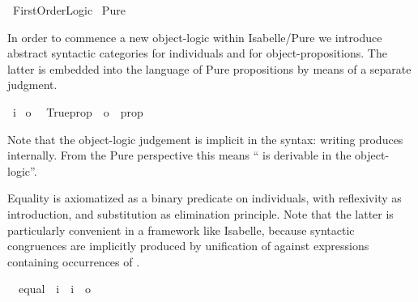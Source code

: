 %
\begin{isabellebody}%
\def\isabellecontext{First{\isacharunderscore}Order{\isacharunderscore}Logic}%
%
\isamarkuptrue%
%
\isadelimvisible
%
\endisadelimvisible
%
\isatagvisible
{}\isamarkupfalse%
\ First{\isacharunderscore}Order{\isacharunderscore}Logic\isanewline
{}\ Pure\isanewline
{}%
\endisatagvisible
{\isafoldvisible}%
%
\isadelimvisible
%
\endisadelimvisible
%
\begin{isamarkuptext}%
\noindent In order to commence a new object-logic within
  Isabelle/Pure we introduce abstract syntactic categories 
  for individuals and  for object-propositions.  The latter
  is embedded into the language of Pure propositions by means of a
  separate judgment.%
\end{isamarkuptext}%
\isamarkuptrue%
\isamarkupfalse%
\ i\isanewline
{}\isamarkupfalse%
\ o\isanewline
\isanewline
{}\isamarkupfalse%
\isanewline
\ \ Trueprop\ {\isacharcolon}{\isacharcolon}\ {\isachardoublequoteopen}o\ {\isasymRightarrow}\ prop{\isachardoublequoteclose}\ \ \ \ {\isacharparenleft}{\isachardoublequoteopen}{\isacharunderscore}{\isachardoublequoteclose}\ {}{\isacharparenright}%
\begin{isamarkuptext}%
\noindent Note that the object-logic judgement is implicit in the
  syntax: writing  produces  internally.
  From the Pure perspective this means `` is derivable in the
  object-logic''.%
\end{isamarkuptext}%
\isamarkuptrue%
%
\isamarkuptrue%
%
\begin{isamarkuptext}%
Equality is axiomatized as a binary predicate on individuals, with
  reflexivity as introduction, and substitution as elimination
  principle.  Note that the latter is particularly convenient in a
  framework like Isabelle, because syntactic congruences are
  implicitly produced by unification of  against
  expressions containing occurrences of .%
\end{isamarkuptext}%
\isamarkuptrue%
\isamarkupfalse%
\isanewline
\ \ equal\ {\isacharcolon}{\isacharcolon}\ {\isachardoublequoteopen}i\ {\isasymRightarrow}\ i\ {\isasymRightarrow}\ o{\isachardoublequoteclose}\ \ {\isacharparenleft}\ {\isachardoublequoteopen}{\isacharequal}{\isachardoublequoteclose}\ {}{}{\isacharparenright}\isanewline

\end{isabellebody}
